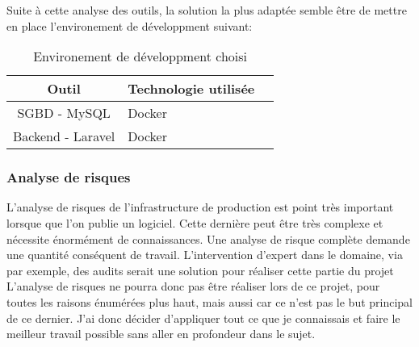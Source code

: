 \documentclass[
    iai, %
    il, %
]{heig-tb}
\begin{document}



Suite à cette analyse des outils, la solution la plus adaptée semble être de mettre en place l'environement de développment suivant:

\begin{table}[h]
    \begin{center}
        \caption{Environement de développment choisi \label{env_prod}}
        \begin{tabular}{c|l|r}
            Outil             & Technologie utilisée \\ \hline
            SGBD - MySQL      & Docker               \\
            Backend - Laravel & Docker               \\
        \end{tabular}
    \end{center}
\end{table}

\subsubsection{Analyse de risques}

L'analyse de risques de l'infrastructure de production est point très important lorsque que l'on publie un logiciel. Cette dernière peut être très complexe et nécessite énormément de connaissances.
Une analyse de risque complète demande une quantité conséquent de travail. L'intervention d'expert dans le domaine, via par exemple, des audits serait une solution pour réaliser cette partie du projet
L'analyse de risques ne pourra donc pas être réaliser lors de ce projet, pour toutes les raisons énumérées plus haut, mais aussi car ce n'est pas le but principal de ce dernier.
J'ai donc décider d'appliquer tout ce que je connaissais et faire le meilleur travail possible sans aller en profondeur dans le sujet.

\end{document}
